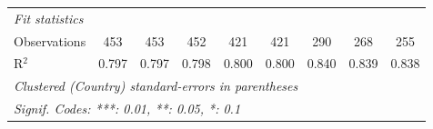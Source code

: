 \begin{tabular}{lcccccccc}
   \midrule \emph{Fit statistics}\\
   Observations                                                & 453          & 453          & 452           & 421          & 421          & 290          & 268          & 255\\  
   R$^2$                                                       & 0.797        & 0.797        & 0.798         & 0.800        & 0.800        & 0.840        & 0.839        & 0.838\\  
   \midrule
   \multicolumn{9}{l}{\emph{Clustered (Country) standard-errors in parentheses}}\\
   \multicolumn{9}{l}{\emph{Signif. Codes: ***: 0.01, **: 0.05, *: 0.1}}\\
\end{tabular}
\par\endgroup



